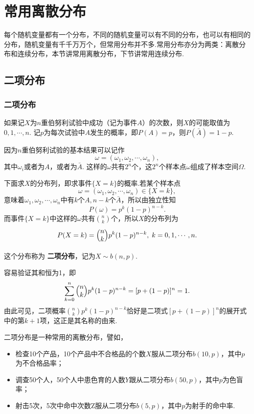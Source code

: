 \section{常用离散分布}
每个随机变量都有一个分布，不同的随机变量可以有不同的分布，也可以有相同的分布，随机变量有千千万万个，但常用分布并不多.常用分布亦分为两类：离散分布和连续分布，本节讲常用离散分布，下节讲常用连续分布.

\subsection{二项分布}
\subsubsection{二项分布}
如果记$X$为$n$重伯努利试验中成功（记为事件$A$）的次数，则$X$的可能取值为$0,1,\cdots,n$. 记$p$为每次试验中$A$发生的概率，即$P(A)=p$，则$P(\bar A)=1-p$.

因为$n$重伯努利试验的基本结果可以记作
\[
  \omega = (\omega_1, \omega_2, \cdots , \omega_n),
\]
其中$\omega_i$或者为$A$，或者为$\bar A$. 这样的$\omega$共有$2^n$个，这$2^n$个样本点$\omega$组成了样本空间$\Omega$.

下面求$X$的分布列，即求事件$\{X=k\}$的概率.若某个样本点
\[
  \omega = (\omega_1,\omega_2,\cdots,\omega_n) \in \{ X = k \},
\]
意味着$\omega_1,\omega_2,\cdots,\omega_n$中有$k$个$A,n-k$个$\bar A$，所以由独立性知
\[
  P(\omega) = p^k(1-p)^{n-k}.
\]
而事件$\{X=k\}$中这样的$\omega$共有$\binom nk$个，所以$X$的分布列为
\begin{equation}\label{eq2.4.1}
  P(X=k) = \Binom nkp^k(1-p)^{n-k},\; k=0,1,\cdots,n.
\end{equation}

这个分布称为 \textbf{二项分布}，记为$X\sim b(n,p)$.

容易验证其和恒为1，即
\[
  \sum_{k=0}^n\Binom nk p^k(1-p)^{n-k} = [ p +(1-p)]^n = 1.
\]
由此可见，二项概率$\binom nk p^k(1-p)^{n-k}$恰好是二项式$[ p +(1-p)]^n$的展开式中的第$k+1$项，这正是其名称的由来.

二项分布是一种常用的离散分布，譬如，
\begin{itemize}

  \item 检查10个产品，10个产品中不合格品的个数$X$服从二项分布$b(10,p)$，其中$p$为不合格品率；

  \item 调查50个人，50个人中患色育的人数$Y$跟从二项分布$b(50,p)$，其中$p$为色盲率；

  \item 射击5次，5次中命中次数Z服从二项分布$b(5,p)$，其中$p$为射手的命中率.
\end{itemize}

